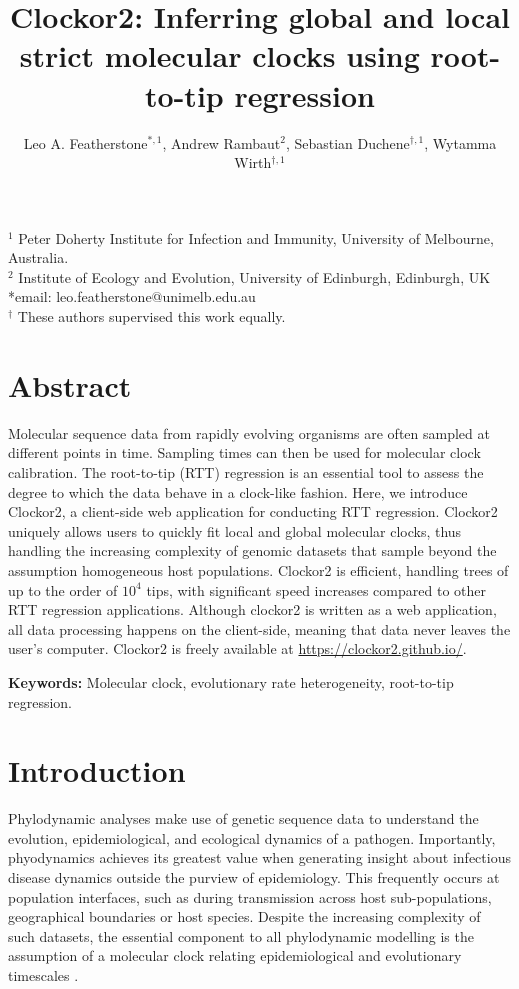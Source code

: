 \documentclass{article}
\title{Clockor2:  Inferring global and local strict molecular clocks using root-to-tip regression}
\author{Leo A. Featherstone$^{\ast,1}$, Andrew Rambaut$^{2}$, Sebastian Duchene$^{\dagger,1}$, Wytamma Wirth$^{\dagger,1}$\\}
\date{}
\begin{document}
\maketitle

$^{1}$ Peter Doherty Institute for Infection and Immunity, University of Melbourne, Australia.\\
$^{2}$ Institute of Ecology and Evolution, University of Edinburgh, Edinburgh, UK\\
*email: leo.featherstone@unimelb.edu.au\\
$^{\dagger}$ These authors supervised this work equally.

\linenumbers
\section*{Abstract}
Molecular sequence data from rapidly evolving organisms are often sampled at different points in time. Sampling times can then be used for molecular clock calibration. The root-to-tip (RTT) regression is an essential tool to assess the degree to which the data behave in a clock-like fashion. Here, we introduce Clockor2, a client-side web application for conducting RTT regression. Clockor2 uniquely allows users to quickly fit local and global molecular clocks, thus handling the increasing complexity of genomic datasets that sample beyond the assumption homogeneous host populations. Clockor2 is efficient, handling trees of up to the order of $10^4$ tips, with significant speed increases compared to other RTT regression applications. Although clockor2 is written as a web application, all data processing happens on the client-side, meaning that data never leaves the user's computer. Clockor2 is freely available at \url{https://clockor2.github.io/}.

\textbf{Keywords:} Molecular clock, evolutionary rate heterogeneity, root-to-tip regression.

\section*{Introduction}
Phylodynamic analyses make use of genetic sequence data to understand the evolution, epidemiological, and ecological dynamics of a pathogen. Importantly, phyodynamics achieves its greatest value when generating insight about infectious disease dynamics outside the purview of epidemiology. This frequently occurs at population interfaces, such as during transmission across host sub-populations,  geographical boundaries or host species. Despite the increasing complexity of such datasets, the essential component to all phylodynamic modelling is the assumption of a molecular clock relating epidemiological and evolutionary timescales \citep{biek_measurably_2015}.
\end{document}
